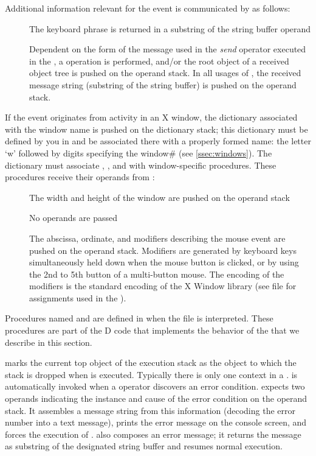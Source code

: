 Additional information relevant for the event is communicated by
 as follows:

\begin{description}
\item[] The keyboard phrase is returned in a
  substring of the string buffer operand
\item[] Dependent on the form of the message used in the
  \emph{send} operator executed in the , a 
  operation is performed, and/or the root object of a received object
  tree is pushed on the operand stack. In all usages of ,
  the received message string (substring of the string buffer) is
  pushed on the operand stack.
\end{description}

\noindent If the event originates from activity in an X window, the
dictionary associated with the window name is pushed on the dictionary
stack; this dictionary must be defined by you in  and be
associated there with a properly formed name: the letter `w' followed
by digits specifying the window\# (see \ref{ssec:windows}). The
dictionary must associate , , and
 with window-specific procedures. These procedures
receive their operands from :

\begin{description}
\item[] The width and height of the window are pushed
  on the operand stack
\item[] No operands are passed
\item[] The abscissa, ordinate, and modifiers
  describing the mouse event are pushed on the operand
  stack. Modifiers are generated by keyboard keys simultaneously held
  down when the mouse button is clicked, or by using the 2nd to 5th
  button of a multi-button mouse. The encoding of the modifiers is the
  standard encoding of the X Window library (see file 
  for assignments used in the ).
\end{description}

Procedures named  and  are defined
in  when the file  is interpreted. These
procedures are part of the D code that implements the behavior of the
 that we describe in this section.

 marks the current top object of the execution stack as
the object to which the stack is dropped when  is
executed. Typically there is only one  context in a
.  is automatically invoked when a 
operator discovers an error condition.  expects two
operands indicating the instance and cause of the error condition on
the operand stack. It assembles a message string from this information
(decoding the error number into a text message), prints the error
message on the console screen, and forces the execution of
.  also composes an error message; it
returns the message as substring of the designated string buffer and
resumes normal execution.

